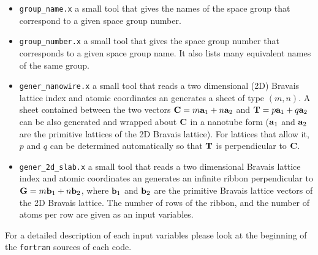 \documentclass[12pt,a4paper]{article}
\begin{document}
\begin{itemize}

\item \texttt{group\_name.x} a small tool that gives the names of the 
space group that correspond to a given space group number. 

\item \texttt{group\_number.x} a small tool that gives the space group number
that corresponds to a given space group name. It also lists many equivalent
names of the same group.

\item \texttt{gener\_nanowire.x} a small tool that reads a two dimensional (2D)
Bravais lattice index and atomic coordinates an generates a sheet of type
$(m,n)$. A sheet contained between the two vectors 
${\bf C} = m {\bf a}_1 + n {\bf a}_2$ and ${\bf T} = p {\bf a}_1 + q {\bf a}_2$
can be also generated and wrapped about ${\bf C}$ in a nanotube form 
(${\bf a}_1$ and ${\bf a}_2$ are the primitive lattices of the 2D Bravais 
lattice). 
For lattices that allow it, $p$ and $q$ can be determined automatically so that 
${\bf T}$ is perpendicular to ${\bf C}$.

\item \texttt{gener\_2d\_slab.x} a small tool that reads a two dimensional 
Bravais lattice index and atomic coordinates an generates an infinite ribbon
perpendicular to ${\bf G} = m {\bf b}_1 + n {\bf b}_2$, where 
${\bf b}_1$ and ${\bf b}_2$ are the primitive Bravais lattice vectors 
of the 2D Bravais lattice. The number of rows of the ribbon, and the number of
atoms per row are given as an input variables.

\end{itemize}

For a detailed description of each input variables please look at the beginning 
of the \texttt{fortran} sources of each code.
\end{document}

